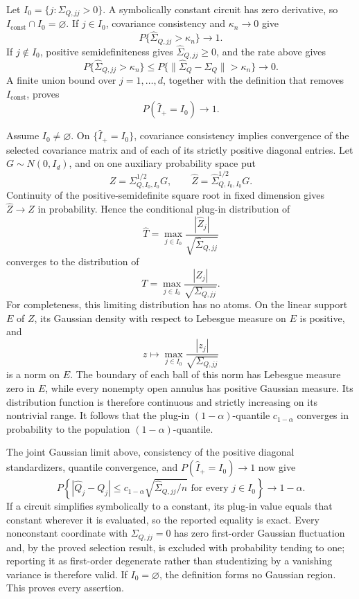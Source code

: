 Let \(I_0=\{j:\Sigma_{Q,jj}>0\}\).  A symbolically constant circuit has zero derivative, so \(I_{\mathrm{const}}\cap I_0=\varnothing\).  If \(j\in I_0\), covariance consistency and \(\kappa_n\to0\) give
\[
 P\{\widehat\Sigma_{Q,jj}>\kappa_n\}\longrightarrow1.
\]
If \(j\notin I_0\), positive semidefiniteness gives \(\widehat\Sigma_{Q,jj}\ge0\), and the rate above gives
\[
 P\{\widehat\Sigma_{Q,jj}>\kappa_n\}
 \le P\{\lVert\widehat\Sigma_Q-\Sigma_Q\rVert>\kappa_n\}
 \longrightarrow0.
\]
A finite union bound over \(j=1,\ldots,d\), together with the definition that removes \(I_{\mathrm{const}}\), proves
\[
 P(\widehat I_+=I_0)\longrightarrow1.
\]

Assume \(I_0\ne\varnothing\).  On \(\{\widehat I_+=I_0\}\), covariance consistency implies convergence of the selected covariance matrix and of each of its strictly positive diagonal entries.  Let \(G\sim N(0,I_d)\), and on one auxiliary probability space put
\[
 Z=\Sigma_{Q,I_0,I_0}^{1/2}G,
 \qquad
 \widehat Z=\widehat\Sigma_{Q,I_0,I_0}^{1/2}G.
\]
Continuity of the positive-semidefinite square root in fixed dimension gives \(\widehat Z\to Z\) in probability.  Hence the conditional plug-in distribution of
\[
 \widehat T=
 \max_{j\in I_0}\frac{|\widehat Z_j|}
 {\sqrt{\widehat\Sigma_{Q,jj}}}
\]
converges to the distribution of
\[
 T=\max_{j\in I_0}\frac{|Z_j|}{\sqrt{\Sigma_{Q,jj}}}.
\]
For completeness, this limiting distribution has no atoms.  On the linear support \(E\) of \(Z\), its Gaussian density with respect to Lebesgue measure on \(E\) is positive, and
\[
 z\longmapsto\max_{j\in I_0}
 \frac{|z_j|}{\sqrt{\Sigma_{Q,jj}}}
\]
is a norm on \(E\).  The boundary of each ball of this norm has Lebesgue measure zero in \(E\), while every nonempty open annulus has positive Gaussian measure.  Its distribution function is therefore continuous and strictly increasing on its nontrivial range.  It follows that the plug-in \((1-\alpha)\)-quantile \(c_{1-\alpha}\) converges in probability to the population \((1-\alpha)\)-quantile.

The joint Gaussian limit above, consistency of the positive diagonal standardizers, quantile convergence, and \(P(\widehat I_+=I_0)\to1\) now give
\[
 P\!\left\{
 |\widehat Q_j-Q_j|
 \le c_{1-\alpha}\sqrt{\widehat\Sigma_{Q,jj}/n}
 \text{ for every }j\in I_0
 \right\}\longrightarrow1-\alpha.
\]
If a circuit simplifies symbolically to a constant, its plug-in value equals that constant wherever it is evaluated, so the reported equality is exact.  Every nonconstant coordinate with \(\Sigma_{Q,jj}=0\) has zero first-order Gaussian fluctuation and, by the proved selection result, is excluded with probability tending to one; reporting it as first-order degenerate rather than studentizing by a vanishing variance is therefore valid.  If \(I_0=\varnothing\), the definition forms no Gaussian region.  This proves every assertion.
